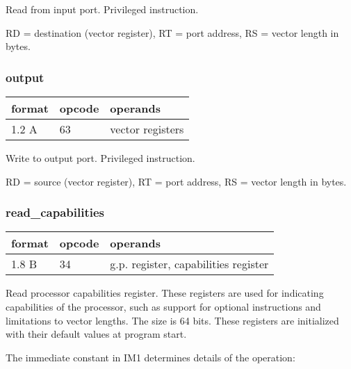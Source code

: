 \documentclass[forwardcom.tex]{subfiles}
\begin{document}
Read from input port. Privileged instruction.
\vspace{2mm}

RD = destination (vector register),
RT = port address, RS = vector length in bytes.

\subsubsection{output}
\label{table:outputInstruction}
\begin{tabular}{|p{12mm}|p{12mm}|p{110mm}|}
\hline
\bfseries format & \bfseries opcode & \bfseries operands \\ \hline
1.2 A & 63 & vector registers \\ \hline
\end{tabular}
\vspace{2mm}

Write to output port. Privileged instruction.
\vspace{2mm}

RD = source (vector register),
RT = port address, RS = vector length in bytes.

\subsubsection{read\_capabilities}
\label{table:readCapabilitiesInstruction}
\begin{tabular}{|p{12mm}|p{12mm}|p{110mm}|}
\hline
\bfseries format & \bfseries opcode & \bfseries operands \\ \hline
1.8 B & 34 & g.p. register, capabilities register \\ \hline
\end{tabular}
\vspace{2mm}

Read processor capabilities register. These registers are used for indicating capabilities of the processor, such as support for optional instructions and limitations to vector lengths. The size is 64 bits. These registers are initialized with their default values at program start.
\vspace{2mm}

The immediate constant in IM1 determines details of the operation:
\end{document}
